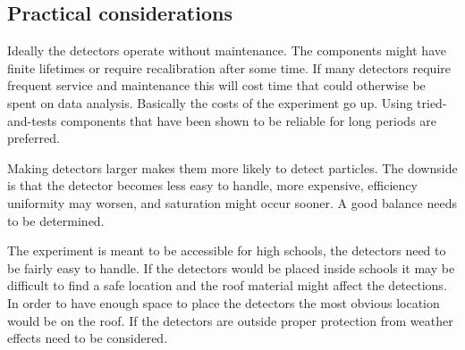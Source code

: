 \subsection{Practical considerations}

Ideally the detectors operate without maintenance. The components might have finite lifetimes or require recalibration after some time. If many detectors require frequent service and maintenance this will cost time that could otherwise be spent on data analysis. Basically the costs of the experiment go up. Using tried-and-tests components that have been shown to be reliable for long periods are preferred.

Making detectors larger makes them more likely to detect particles. The downside is that the detector becomes less easy to handle, more expensive, efficiency uniformity may worsen, and saturation might occur sooner. A good balance needs to be determined.

The experiment is meant to be accessible for high schools, the detectors need to be fairly easy to handle. If the detectors would be placed inside schools it may be difficult to find a safe location and the roof material might affect the detections. In order to have enough space to place the detectors the most obvious location would be on the roof. If the detectors are outside proper protection from weather effects need to be considered.


